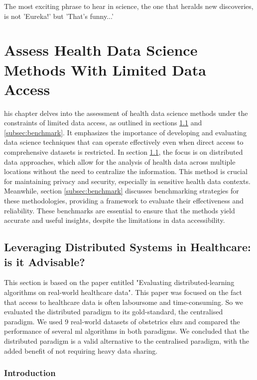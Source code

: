 
\begin{savequote}[75mm]
    The most exciting phrase to hear in science, the one that heralds new discoveries, is not 'Eureka!' but 'That's funny...'
    \end{savequote}

\chapter{Assess Health Data Science Methods With Limited Data Access}\label{chap:goal2}
his chapter delves into the assessment of health data science methods under the constraints of limited data access, as outlined in sections \ref{subsec:distributed} and \ref{subsec:benchmark}. It emphasizes the importance of developing and evaluating data science techniques that can operate effectively even when direct access to comprehensive datasets is restricted. In section \ref{subsec:distributed}, the focus is on distributed data approaches, which allow for the analysis of health data across multiple locations without the need to centralize the information. This method is crucial for maintaining privacy and security, especially in sensitive health data contexts. Meanwhile, section \ref{subsec:benchmark} discusses benchmarking strategies for these methodologies, providing a framework to evaluate their effectiveness and reliability. These benchmarks are essential to ensure that the methods yield accurate and useful insights, despite the limitations in data accessibility.


\section{Leveraging Distributed Systems in Healthcare: is it Advisable?}\label{subsec:distributed}
This section is based on the paper entitled "Evaluating distributed-learning algorithms on real-world healthcare data". This paper was focused on the fact that access to healthcare data is often laboursome and time-consuming. So we evaluated the distributed paradigm to its gold-standard, the centralised paradigm. We used 9 real-world datasets of obstetrics \acp{ehr} and compared the performance of several \ac{ml} algorithms in both paradigms. We concluded that the distributed paradigm is a valid alternative to the centralised paradigm, with the added benefit of not requiring heavy data sharing.

\subsection{Introduction}

